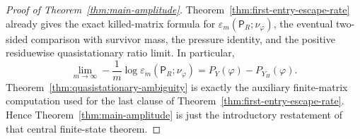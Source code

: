 \begin{proof}[Proof of Theorem~\ref{thm:main-amplitude}]
Theorem~\ref{thm:first-entry-escape-rate} already gives the exact
killed-matrix formula for \(\varepsilon_m(\mathsf P_R;\nu_\varphi)\),
the eventual two-sided comparison with survivor mass, the pressure
identity, and the positive residuewise quasistationary ratio limit.  In
particular,
\[
  \lim_{m\to\infty}
  -\frac1m\log\varepsilon_m(\mathsf P_R;\nu_\varphi)
  =
  P_Y(\varphi)-P_{Y_H}(\varphi).
\]
Theorem~\ref{thm:quasistationary-ambiguity} is exactly the auxiliary
finite-matrix computation used for the last clause of
Theorem~\ref{thm:first-entry-escape-rate}.  Hence
Theorem~\ref{thm:main-amplitude} is just the introductory restatement of
that central finite-state theorem.
\end{proof}
